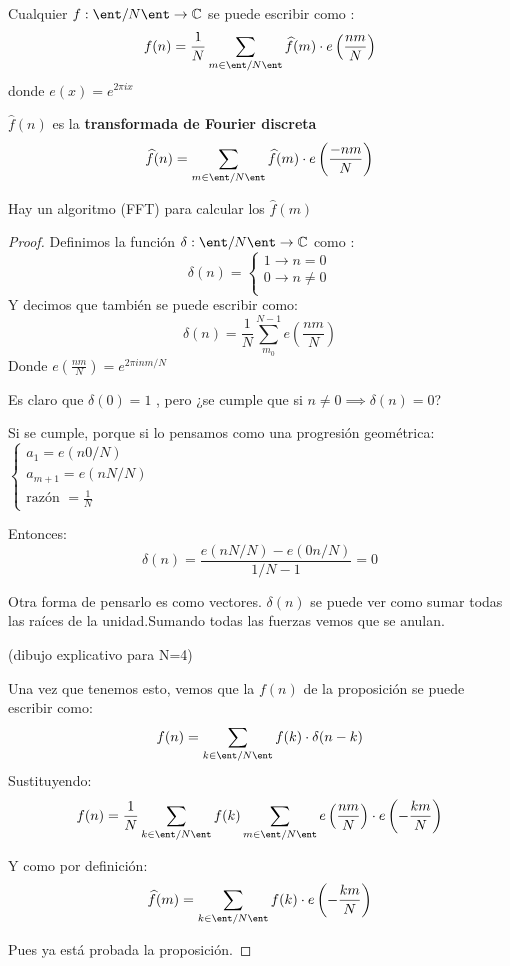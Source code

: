 \begin{prop}
	
	Cualquier $f : \ent/N\ent \rightarrow \mathbb{C}$ se puede escribir como :
	$$f(n) = \frac{1}{N}\sum_{m\in \ent/N\ent}\widehat{f}(m)\cdot e\left(\frac{nm}{N}\right)$$
	donde $e(x) = e^{2\pi ix}$
	
	$\widehat{f}(n)$ es la \textbf{transformada de Fourier discreta}
	$$\widehat{f}(n) = \sum_{m\in \ent/N\ent}\widehat{f}(m)\cdot e\left(\frac{-nm}{N}\right)$$
	
\end{prop}
\obs Hay un algoritmo (FFT) para calcular los $\widehat{f}(m)$

\begin{proof}
	Definimos la función $\delta : \ent/N\ent \rightarrow \mathbb{C}$ como :
	$$\delta (n) = \begin{cases}
	1 \rightarrow n=0\\
	0 \rightarrow n\neq 0 \\
	\end{cases}$$
	Y decimos que también se puede escribir como:
	$$\delta (n) = \frac{1}{N} \sum_{m_0}^{N-1} e\left(\frac{nm}{N}\right)$$
	Donde $e(\frac{nm}{N}) = e^{2\pi inm/N}$
	
	Es claro que $\delta(0) = 1$ , pero ¿se cumple que si $n\neq 0 \implies \delta (n) = 0$?
	
	Si se cumple, porque si lo pensamos como una progresión geométrica:
	$\begin{cases}
	a_1 = e(n0/N)\\
	a_{m+1} = e(nN/N)\\
	\text{razón } = \frac{1}{N}
	\end{cases}$
	
	Entonces:
	$$\delta (n) = \frac{e(nN/N) - e(0n/N)}{1/N - 1} = 0$$
	
	Otra forma de pensarlo es como vectores. $\delta(n)$ se puede ver como sumar todas las raíces de la unidad.Sumando todas las fuerzas vemos que se anulan.
	
	(dibujo explicativo para N=4)
	
	Una vez que tenemos esto, vemos que la $f(n)$ de la proposición se puede escribir como:
	$$f(n) = \sum_{k\in \ent/N\ent} f(k) \cdot \delta(n-k)$$
	Sustituyendo:
	$$f(n) = \frac{1}{N} \sum_{k\in \ent/N\ent} f(k)  \sum_{m \in \ent/N\ent} e\left(\frac{nm}{N}\right) \cdot e\left(- \frac{km}{N}\right)$$
	
	Y como por definición:
	$$\widehat{f}(m) = \sum_{k\in \ent/N\ent} f(k) \cdot e\left(- \frac{km}{N}\right)$$
	
	Pues ya está probada la proposición.
\end{proof}
